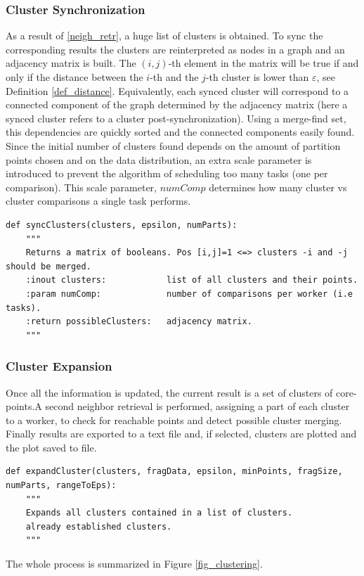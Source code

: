 \documentclass[10pt,journal,compsoc]{IEEEtran}
\begin{document}
\subsubsection*{Cluster Synchronization} \label{cluster_sync}
As a result of \ref{neigh_retr}, a huge list of clusters is obtained. To sync the corresponding results the clusters are reinterpreted as nodes in a graph and an adjacency matrix is built. The $(i,j)$-th element in the matrix will be true if and only if the distance between the $i$-th and the $j$-th cluster is lower than $\varepsilon$, see Definition \ref{def_distance}. Equivalently, each synced cluster will correspond to a connected component of the graph determined by the adjacency matrix (here a synced cluster refers to a cluster post-synchronization). Using a merge-find set, this dependencies are quickly sorted and the connected components easily found.
Since the initial number of clusters found depends on the amount of partition points chosen and on the data distribution, an extra scale parameter is introduced to prevent the algorithm of scheduling too many tasks (one per comparison). This scale parameter, $numComp$ determines how many cluster vs cluster comparisons a single task performs.
\begin{lstlisting}
def syncClusters(clusters, epsilon, numParts):
    """
    Returns a matrix of booleans. Pos [i,j]=1 <=> clusters -i and -j should be merged.
    :inout clusters:            list of all clusters and their points.
    :param numComp:             number of comparisons per worker (i.e tasks).
    :return possibleClusters:   adjacency matrix.
    """
\end{lstlisting}
\subsubsection*{Cluster Expansion} \label{cluster_exp} 
Once all the information is updated, the current result is a set of clusters of core-points.A second neighbor retrieval is performed, assigning a part of each cluster to a worker, to check for reachable points and detect possible cluster merging. Finally results are exported to a text file and, if selected, clusters are plotted and the plot saved to file.
\begin{lstlisting}
def expandCluster(clusters, fragData, epsilon, minPoints, fragSize, numParts, rangeToEps):
    """
    Expands all clusters contained in a list of clusters. 
    already established clusters.
    """
\end{lstlisting}
The whole process is summarized in Figure \ref{fig_clustering}.
\end{document}
